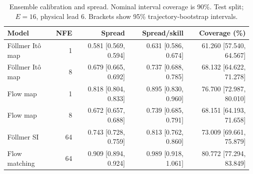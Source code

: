 \begin{table}[t]
\centering
\small
\setlength{\tabcolsep}{3pt}
\caption{Ensemble calibration and spread. Nominal interval coverage is 90\%. Test split; $E=16$, physical lead 6. Brackets show 95\% trajectory-bootstrap intervals.}
\label{tab:map-calibration}
\begin{tabular}{lrrrr}
\toprule
Model & NFE & Spread & Spread/skill & Coverage (\%) \\
\midrule
Föllmer Itô map & 1 & 0.581 [0.569, 0.594] & 0.631 [0.586, 0.674] & 61.260 [57.540, 64.567] \\
Föllmer Itô map & 8 & 0.679 [0.665, 0.692] & 0.737 [0.688, 0.785] & 68.132 [64.622, 71.278] \\
\addlinespace
Flow map & 1 & 0.818 [0.804, 0.833] & 0.895 [0.830, 0.960] & 76.700 [72.987, 80.010] \\
Flow map & 8 & 0.672 [0.657, 0.688] & 0.739 [0.685, 0.791] & 68.151 [64.193, 71.658] \\
\addlinespace
Föllmer SI & 64 & 0.743 [0.728, 0.759] & 0.813 [0.762, 0.860] & 73.009 [69.661, 75.879] \\
\addlinespace
Flow matching & 64 & 0.909 [0.894, 0.924] & 0.989 [0.918, 1.061] & 80.772 [77.294, 83.849] \\
\bottomrule
\end{tabular}
\end{table}
